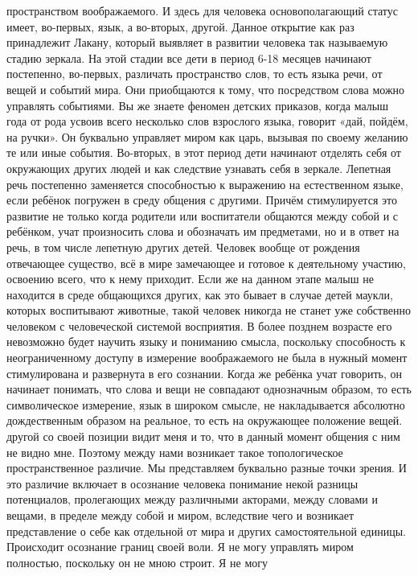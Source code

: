 пространством воображаемого. И здесь для человека основополагающий статус имеет,
во-первых, язык, а во-вторых, другой. Данное открытие как раз принадлежит
Лакану, который выявляет в развитии человека так называемую стадию зеркала. На
этой стадии все дети в период 6-18 месяцев начинают постепенно, во-первых,
различать пространство слов, то есть языка речи, от вещей и событий мира. Они
приобщаются к тому, что посредством слова можно управлять событиями. Вы же
знаете феномен детских приказов, когда малыш года от рода усвоив всего несколько
слов взрослого языка, говорит «дай, пойдём, на ручки». Он буквально управляет
миром как царь, вызывая по своему желанию те или иные события. Во-вторых, в этот
период дети начинают отделять себя от окружающих других людей и как следствие
узнавать себя в зеркале. Лепетная речь постепенно заменяется способностью к
выражению на естественном языке, если ребёнок погружен в среду общения с
другими. Причём стимулируется это развитие не только когда родители или
воспитатели общаются между собой и с ребёнком, учат произносить слова и
обозначать им предметами, но и в ответ на речь, в том числе лепетную других
детей. Человек вообще от рождения отвечающее существо, всё в мире замечающее и
готовое к деятельному участию, освоению всего, что к нему приходит. Если же на
данном этапе малыш не находится в среде общающихся других, как это бывает в
случае детей маукли, которых воспитывают животные, такой человек никогда не
станет уже собственно человеком с человеческой системой восприятия. В более
позднем возрасте его невозможно будет научить языку и пониманию смысла,
поскольку способность к неограниченному доступу в измерение воображаемого не
была в нужный момент стимулирована и развернута в его сознании. Когда же ребёнка
учат говорить, он начинает понимать, что слова и вещи не совпадают однозначным
образом, то есть символическое измерение, язык в широком смысле, не
накладывается абсолютно дождественным образом на реальное, то есть на окружающее
положение вещей. другой со своей позиции видит меня и то, что в данный момент
общения с ним не видно мне. Поэтому между нами возникает такое топологическое
пространственное различие. Мы представляем буквально разные точки зрения. И это
различие включает в осознание человека понимание некой разницы потенциалов,
пролегающих между различными акторами, между словами и вещами, в пределе между
собой и миром, вследствие чего и возникает представление о себе как отдельной от
мира и других самостоятельной единицы. Происходит осознание границ своей воли. Я
не могу управлять миром полностью, поскольку он не мною строит. Я не могу
